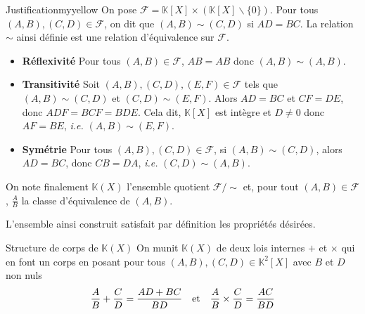     \begin{demo}{Justification}{myyellow}
        On pose $\mathcal{F} = \mathbb{K}[X] \times \left(\mathbb{K}[X] \backslash \{0\}\right)$. Pour tous $(A,B),(C,D) \in \mathcal{F}$, on dit que $(A,B) \sim (C,D)$ si $AD = BC$. La relation $\sim$ ainsi définie est une relation d’équivalence sur $\mathcal{F}$.
        \begin{itemize}[label=\textcolor{myyellow}{$\star$}]
            \item \textbf{Réflexivité} \quad Pour tous $(A,B) \in \mathcal{F}$, $AB = AB$ donc $(A,B) \sim (A,B)$.
            \item \textbf{Transitivité} \quad Soit $(A,B), (C,D), (E,F) \in \mathcal{F}$ tels que $(A,B) \sim (C,D)$ et $(C,D) \sim (E,F)$. Alors 
            $AD = BC$ et $CF = DE$, donc $ADF = BCF = BDE$. Cela dit, $\mathbb{K}[X]$ est intègre et $D \neq 0$ donc $AF = BE$, \textit{i.e.} $(A,B) \sim (E,F)$.
            \item \textbf{Symétrie} \quad Pour tous $(A,B), (C,D) \in \mathcal{F}$, si $(A,B) \sim (C,D)$, alors $AD = BC$, donc $CB = DA$, \textit{i.e.} $(C,D) \sim (A,B)$.
        \end{itemize}
        On note finalement $\mathbb{K}(X)$ l’ensemble quotient $\mathcal{F} \Big/ \sim $ et, pour tout $(A,B) \in \mathcal{F}$, $\frac{A}{B}$ la classe d’équivalence de $(A,B)$. 

        L’ensemble ainsi construit satisfait par définition les propriétés désirées. 
    \end{demo}

    \begin{defi}{Structure de corps de $\mathbb{K}(X)$}{}
        On munit $\mathbb{K}(X)$ de deux lois internes $+$ et $\times$ qui en font un corps en posant pour tous $(A,B), (C,D) \in \mathbb{K}^2[X]$ avec $B$ et $D$ non nuls 
        \[ \frac{A}{B} + \frac{C}{D} = \frac{AD + BC}{BD} \quad \text{et} \quad \frac{A}{B} \times \frac{C}{D} = \frac{AC}{BD} \]
    \end{defi}

